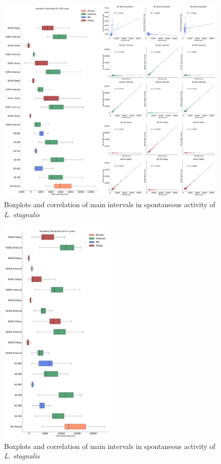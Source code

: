 \begin{figure}[bth!]
	\centering
	\includegraphics[width=\textwidth]{img/invariants/prep1_3 intervals panel.pdf}
	\caption{Boxplots and correlation of main intervals in spontaneous activity of \textit{L. stagnalis}}
	\label{fig:prep1 invariants}
\end{figure}



\begin{figure}[bth!]
	\centering
	\includegraphics[width=0.5\textwidth]{img/invariants/prep3_3 intervals panel.pdf}
	\caption{Boxplots and correlation of main intervals in spontaneous activity of \textit{L. stagnalis}}
	\label{fig:prep3 invariants}
\end{figure}





